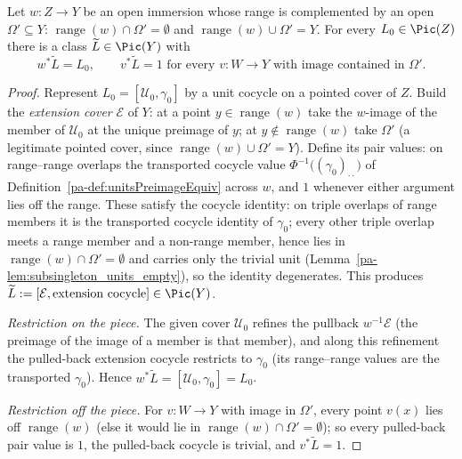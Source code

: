 \begin{theorem}
  \label{pa-thm:cechPic_extendClass}
  \leanok

  Let \(w \colon Z \to Y\) be an open immersion whose range is complemented by an open
  \(\Omega' \subseteq Y\): \(\operatorname{range}(w) \cap \Omega' = \emptyset\) and
  \(\operatorname{range}(w) \cup \Omega' = Y\). For every \(L_0 \in \Pic(Z)\) there is a class
  \(\widetilde L \in \Pic(Y)\) with
  \[
    w^{*}\widetilde L = L_0, \qquad v^{*}\widetilde L = 1 \text{ for every } v \colon W \to Y
    \text{ with image contained in } \Omega'.
  \]
\end{theorem}
\begin{proof}
  \leanok
  Represent \(L_0 = [\mathcal U_0, \gamma_0]\) by a unit cocycle on a pointed cover of \(Z\). Build
  the \emph{extension cover} \(\mathcal E\) of \(Y\): at a point \(y \in \operatorname{range}(w)\)
  take the \(w\)-image of the member of \(\mathcal U_0\) at the unique preimage of \(y\); at
  \(y \notin \operatorname{range}(w)\) take \(\Omega'\) (a legitimate pointed cover, since
  \(\operatorname{range}(w) \cup \Omega' = Y\)). Define its pair values: on range--range overlaps
  the transported cocycle value \(\Phi^{-1}\bigl((\gamma_0)_{\cdot\cdot}\bigr)\) of
  Definition~\ref{pa-def:unitsPreimageEquiv} across \(w\), and \(1\) whenever either argument lies off
  the range. These satisfy the cocycle identity: on triple overlaps of range members it is the
  transported cocycle identity of \(\gamma_0\); every other triple overlap meets a range member and
  a non-range member, hence lies in \(\operatorname{range}(w) \cap \Omega' = \emptyset\) and carries
  only the trivial unit (Lemma~\ref{pa-lem:subsingleton_units_empty}), so the identity degenerates.
  This produces \(\widetilde L := [\mathcal E, \text{extension cocycle}] \in \Pic(Y)\).

  \emph{Restriction on the piece.} The given cover \(\mathcal U_0\) refines the pullback
  \(w^{-1}\mathcal E\) (the preimage of the image of a member is that member), and along this
  refinement the pulled-back extension cocycle restricts to \(\gamma_0\) (its range--range values
  are the transported \(\gamma_0\)). Hence \(w^{*}\widetilde L = [\mathcal U_0, \gamma_0] = L_0\).

  \emph{Restriction off the piece.} For \(v \colon W \to Y\) with image in \(\Omega'\), every point
  \(v(x)\) lies off \(\operatorname{range}(w)\) (else it would lie in
  \(\operatorname{range}(w) \cap \Omega' = \emptyset\)); so every pulled-back pair value is \(1\),
  the pulled-back cocycle is trivial, and \(v^{*}\widetilde L = 1\).
\end{proof}

